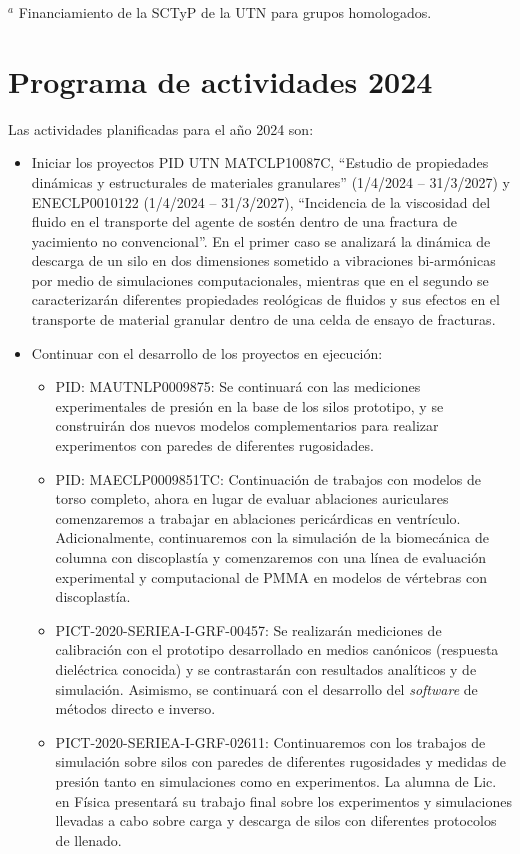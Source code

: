\documentclass[a4paper,11pt,twoside,final,titlepage,onecolumn,openright]{report}
\begin{document}
\vspace{0.5cm}
$^a$ Financiamiento de la SCTyP de la UTN para grupos homologados.


\chapter{Programa de actividades 2024}

Las actividades planificadas para el año 2024 son:

\begin{itemize}
\item Iniciar los proyectos PID UTN MATCLP10087C, ``Estudio de propiedades dinámicas y estructurales de materiales granulares'' (1/4/2024 -- 31/3/2027) y ENECLP0010122 (1/4/2024 -- 31/3/2027), ``Incidencia de la viscosidad del fluido en el transporte del agente de sostén dentro de una fractura de yacimiento no convencional''. En el primer caso se analizará la dinámica de descarga de un silo en dos dimensiones sometido a vibraciones bi-armónicas por medio de simulaciones computacionales, mientras que en el segundo se caracterizarán diferentes propiedades reológicas de fluidos y sus efectos en el transporte de material granular dentro de una celda de ensayo de fracturas.
\item Continuar con el desarrollo de los proyectos en ejecución:
    \begin{itemize}
\item PID: MAUTNLP0009875: Se continuará con las mediciones experimentales de presión en la base de los silos prototipo, y se construirán dos nuevos modelos complementarios para realizar experimentos con paredes de diferentes rugosidades. 
\item PID: MAECLP0009851TC: Continuación de trabajos con modelos de torso completo, ahora en lugar de evaluar ablaciones auriculares comenzaremos a trabajar en ablaciones pericárdicas en ventrículo. Adicionalmente, continuaremos con la simulación de la biomecánica de columna con discoplastía y comenzaremos con una línea de evaluación experimental y computacional de PMMA en modelos de vértebras con discoplastía.
\item PICT-2020-SERIEA-I-GRF-00457: Se realizarán mediciones de calibración con el prototipo desarrollado en medios canónicos (respuesta dieléctrica conocida) y se contrastarán con resultados analíticos y de simulación. Asimismo, se continuará con el desarrollo del \textit{software} de métodos directo e inverso.
\item PICT-2020-SERIEA-I-GRF-02611: Continuaremos con los trabajos de simulación sobre silos con paredes de diferentes rugosidades y medidas de presión tanto en simulaciones como en experimentos. La alumna de Lic. en Física presentará su trabajo final sobre los experimentos y simulaciones llevadas a cabo sobre carga y descarga de silos con diferentes protocolos de llenado.

\end{itemize}
\end{itemize}
\end{document}
